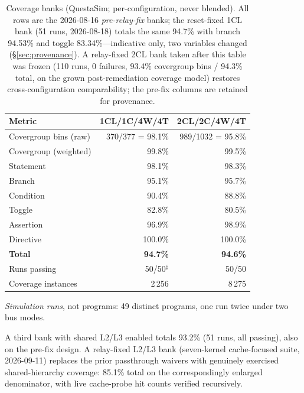 \documentclass[conference]{IEEEtran}
\begin{document}
\begin{table}[t]
	\caption{Coverage banks (QuestaSim; per-configuration, never
		blended). All rows are the 2026-08-16 \emph{pre-relay-fix} banks;
		the reset-fixed 1CL bank (51 runs, 2026-08-18) totals the same
		94.7\% with branch 94.53\% and toggle 83.34\%---indicative only,
		two variables changed (\S\ref{sec:provenance}). A relay-fixed 2CL
		bank taken after this table was frozen (110 runs, 0 failures,
		93.4\% covergroup bins / 94.3\% total, on the grown
		post-remediation coverage model) restores cross-configuration
		comparability; the pre-fix columns are retained for provenance.}
	\label{tab:coverage}
	\centering
	\small
	\setlength{\tabcolsep}{4.5pt}
	\begin{threeparttable}
		\begin{tabular}{lrr}
			\toprule
			Metric                & 1CL/1C/4W/4T       & 2CL/2C/4W/4T      \\
			\midrule
			Covergroup bins (raw) & 370/377 = 98.1\%   & 989/1032 = 95.8\% \\
			Covergroup (weighted) & 99.8\%             & 99.5\%            \\
			Statement             & 98.1\%             & 98.3\%            \\
			Branch                & 95.1\%             & 95.7\%            \\
			Condition             & 90.4\%             & 88.8\%            \\
			Toggle                & 82.8\%             & 80.5\%            \\
			Assertion             & 96.9\%             & 98.9\%            \\
			Directive             & 100.0\%            & 100.0\%           \\
			\midrule
			\textbf{Total}        & \textbf{94.7\%}    & \textbf{94.6\%}   \\
			Runs passing          & 50/50$^{\ddagger}$ & 50/50             \\
			Coverage instances    & 2\,256             & 8\,275            \\
			\bottomrule
		\end{tabular}
		\begin{tablenotes}\footnotesize
			\item[$\ddagger$] \emph{Simulation runs}, not programs: 49
			distinct programs, one run twice under two bus modes.
			\item A third bank with shared L2/L3 enabled totals 93.2\%
			(51 runs, all passing), also on the pre-fix design. A
			relay-fixed L2/L3 bank (seven-kernel cache-focused suite,
			2026-09-11) replaces the prior passthrough waivers with
			genuinely exercised shared-hierarchy coverage: 85.1\% total
			on the correspondingly enlarged denominator, with live
			cache-probe hit counts verified recursively.
		\end{tablenotes}
	\end{threeparttable}
\end{table}
\end{document}
